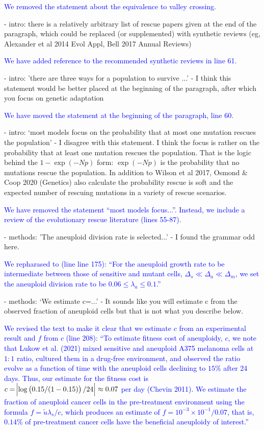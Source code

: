 \documentclass[12pt]{extarticle}
\begin{document}
\textcolor{blue}{
We removed the statement about the equivalence to valley crossing.
} 

- intro: there is a relatively arbitrary list of rescue papers given at the end of the paragraph, which could be replaced (or supplemented) with synthetic reviews (eg, Alexander et al 2014 Evol Appl, Bell 2017 Annual Reviews)

\textcolor{blue}{%
We have added reference to the recommended synthetic reviews in line 61.
} 

- intro: 'there are three ways for a population to survive ...' - I think this statement would be better placed at the beginning of the paragraph, after which you focus on genetic adaptation

\textcolor{blue}{%
We have  moved the statement at the beginning of the paragraph, line 60. 
} 

- intro: `most models focus on the probability that at most one mutation rescues the population' - I disagree with this statement. I think the focus is rather on the probability that at least one mutation rescues the population. That is the logic behind the $1-\exp(-Np)$ form: $\exp(-Np)$ is the probability that no mutations rescue the population. In addition to Wilson et al 2017, Osmond $\&$ Coop 2020 (Genetics) also calculate the probability rescue is soft and the expected number of rescuing mutations in a variety of rescue scenarios.

\textcolor{blue}{%
We have removed the statement ``most models focus...''. Instead, we include a review of the evolutionary rescue literature (lines 55-87).
} 

- methods: 'The aneuploid division rate is selected...' - I found the grammar odd here.

\textcolor{blue}{%
We repharased to (line line 175): ``For the aneuploid growth rate to be intermediate between those of sensitive and mutant cells, $\Delta_s\ll\Delta_a\ll\Delta_m$, we set the aneuploid division rate to be $0.06 \le \lambda_a \le 0.1$.''
} 

- methods: `We estimate c=...' - It sounds like you will estimate c from the observed fraction of aneuploid cells but that is not what you describe below.

\textcolor{blue}{%
We revised the text to make it clear that we estimate $c$ from an experimental result and $f$ from $c$ (line 208): ``To estimate fitness cost of aneuploidy, $c$, we note that Lukow et al. (2021) mixed sensitive and aneuploid A375 melanoma cells at $1:1$ ratio, cultured them in a drug-free environment, and observed the ratio evolve as a function of time with the aneuploid cells declining to $15\%$ after 24 days. Thus, our estimate for the fitness cost is $c=\abs{\log\left(0.15/(1-0.15)\right)/24}\approx0.07$ per day (Chevin 2011).
We estimate the fraction of aneuploid cancer cells in the pre-treatment environment using the formula $f=\tilde{u}\lambda_s / c$, which produces an estimate of $f=10^{-3}\times10^{-1}/0.07$, that is, $0.14\%$ of pre-treatment cancer cells have the beneficial aneuploidy of interest.''
} 
\end{document}
